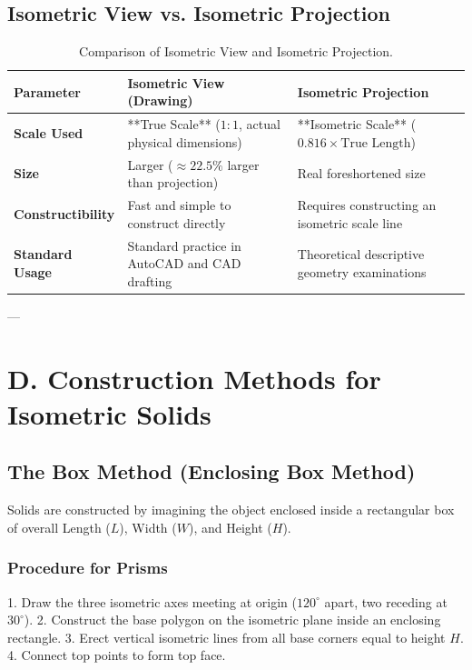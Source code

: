 \subsection{Isometric View vs. Isometric Projection}

\begin{table}[htbp]
\centering
\small
\begin{tabularx}{\textwidth}{l X X}
\toprule
\textbf{Parameter} & \textbf{Isometric View (Drawing)} & \textbf{Isometric Projection} \\
\midrule
\textbf{Scale Used} & **True Scale** ($1:1$, actual physical dimensions) & **Isometric Scale** ($0.816 \times \text{True Length}$) \\
\textbf{Size} & Larger ($\approx 22.5\%$ larger than projection) & Real foreshortened size \\
\textbf{Constructibility} & Fast and simple to construct directly & Requires constructing an isometric scale line \\
\textbf{Standard Usage} & Standard practice in AutoCAD and CAD drafting & Theoretical descriptive geometry examinations \\
\bottomrule
\end{tabularx}
\caption{Comparison of Isometric View and Isometric Projection.}
\label{tab:iso-view-vs-proj}
\end{table}

---

\section{D. Construction Methods for Isometric Solids}

\subsection{The Box Method (Enclosing Box Method)}
Solids are constructed by imagining the object enclosed inside a rectangular box of overall Length ($L$), Width ($W$), and Height ($H$).

\subsubsection{Procedure for Prisms}
1. Draw the three isometric axes meeting at origin ($120^\circ$ apart, two receding at $30^\circ$).
2. Construct the base polygon on the isometric plane inside an enclosing rectangle.
3. Erect vertical isometric lines from all base corners equal to height $H$.
4. Connect top points to form top face.

